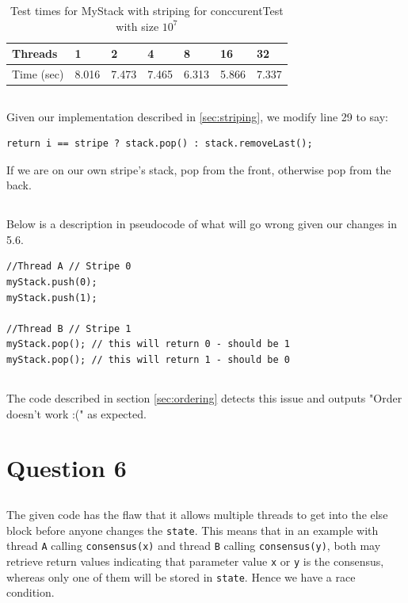 \documentclass[a5paper]{article}
\begin{document}
\begin{table}[ht!]
\centering
\begin{tabular}{|l|l|l|l|l|l|l|}
\hline
Threads & 1 & 2 & 4 & 8 & 16 & 32 \\ \hline
Time (sec) & 8.016 & 7.473 & 7.465 & 6.313 & 5.866 & 7.337 \\ \hline
\end{tabular}
\caption{Test times for MyStack with striping for conccurentTest with size $10^7$}
\label{table:striping}
\end{table}

\subsection{}
Given our implementation described in \ref{sec:striping}, we modify line 29 to say:
\begin{lstlisting}
return i == stripe ? stack.pop() : stack.removeLast();
\end{lstlisting}
If we are on our own stripe's stack, pop from the front, otherwise pop from the back.

\subsection{}
Below is a description in pseudocode of what will go wrong given our changes in 5.6.

\begin{lstlisting}
//Thread A // Stripe 0
myStack.push(0);
myStack.push(1);

//Thread B // Stripe 1
myStack.pop(); // this will return 0 - should be 1
myStack.pop(); // this will return 1 - should be 0
\end{lstlisting}

\subsection{}
The code described in section \ref{sec:ordering} detects this issue and outputs "Order doesn't work :(" as expected.

\section{Question 6}
\subsection{}
The given code has the flaw that it allows multiple threads to get into the else block before anyone changes the \texttt{state}.
This means that in an example with thread \texttt{A} calling \texttt{consensus(x)} and thread \texttt{B} calling \texttt{consensus(y)}, both may retrieve return values
indicating that parameter value \texttt{x} or \texttt{y} is the consensus, whereas only one of them will be stored in \texttt{state}. Hence we have a race condition.
\end{document}
